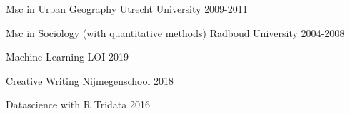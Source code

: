 



\begin{cvhonors}

  \cvhonor
    {Msc in Urban Geography} %
    {} %
    {Utrecht University} %
    {2009-2011} %

  \cvhonor
    {Msc in Sociology (with quantitative methods)} %
    {} %
    {Radboud University} %
    {2004-2008} %

\end{cvhonors}




\begin{cvhonors}

  \cvhonor
    {Machine Learning} %
    {} %
    {LOI} %
    {2019} %

  \cvhonor
    {Creative Writing} %
    {} %
    {Nijmegenschool} %
    {2018} %

  \cvhonor
    {Datascience with R} %
    {} %
    {Tridata} %
    {2016} %

\end{cvhonors}
